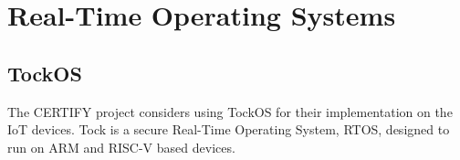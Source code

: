 \section{Real-Time Operating Systems} %
\label{sec:Real-Time Operating Systems}

\subsection{TockOS} %
\label{sub:TockOS}

The CERTIFY project considers using TockOS for their implementation on the IoT devices.
Tock is a secure Real-Time Operating System, RTOS, designed to run on ARM and RISC-V based devices.

